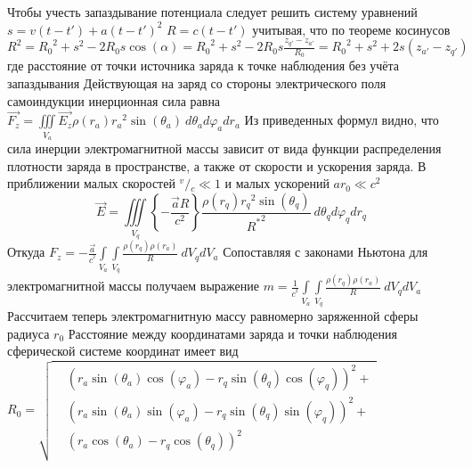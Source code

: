 ﻿\documentclass{article}
\begin{document}
Чтобы учесть запаздывание потенциала следует решить систему уравнений
$s=v\left( t-t' \right)+a{{\left( t-t' \right)}^{2}}$ 
$R=c\left( t-t' \right)$ 
учитывая, что по теореме косинусов
${{R}^{2}}={{R}_{0}}^{2}+{{s}^{2}}-2{{R}_{0}}s\cos \left( \alpha  \right)={{R}_{0}}^{2}+{{s}^{2}}-2{{R}_{0}}s\frac{{{z}_{q'}}-{{z}_{a'}}}{{{R}_{0}}}={{R}_{0}}^{2}+{{s}^{2}}+2s\left( {{z}_{a'}}-{{z}_{q'}} \right)$ 
где  расстояние от точки источника заряда к точке наблюдения без учёта запаздывания
Действующая на заряд со стороны электрического поля самоиндукции инерционная сила равна
$\overrightarrow{{{F}_{z}}}=\iiint\limits_{{{V}_{a}}}{\overrightarrow{{{E}_{z}}}\rho \left( {{r}_{a}} \right){{r}_{a}}^{2}\sin \left( {{\theta }_{a}} \right)}\ d{{\theta }_{a}}d{{\varphi }_{a}}d{{r}_{a}}$ 
Из приведенных формул видно, что сила инерции электромагнитной массы зависит от вида функции распределения плотности заряда в пространстве, а также от скорости и ускорения заряда.
В приближении малых скоростей ${}^{v}/{}_{c}\ll 1$  и малых ускорений $a{{r}_{0}}\ll {{c}^{2}}$ 
\[\overrightarrow{E}=\iiint\limits_{{{V}_{q}}}{\left\{ -\frac{\overrightarrow{a}R}{{{c}^{2}}} \right\}\frac{\rho \left( {{r}_{q}} \right){{r}_{q}}^{2}\sin \left( {{\theta }_{q}} \right)}{{{R}^{*}}^{2}}\ }d{{\theta }_{q}}d{{\varphi }_{q}}d{{r}_{q}}\]
Откуда 
${{F}_{z}}=-\frac{\overrightarrow{a}}{{{c}^{^{2}}}}\int\limits_{{{V}_{a}}}{\int\limits_{{{V}_{q}}}{\frac{\rho \left( {{r}_{q}} \right)\rho \left( {{r}_{a}} \right)}{R}}}\ d{{V}_{q}}d{{V}_{a}}$ 
Сопоставляя с законами Ньютона для электромагнитной массы получаем выражение
$m=\frac{1}{{{c}^{^{2}}}}\int\limits_{{{V}_{a}}}{\int\limits_{{{V}_{q}}}{\frac{\rho \left( {{r}_{q}} \right)\rho \left( {{r}_{a}} \right)}{R}}}\ d{{V}_{q}}d{{V}_{a}}$
Рассчитаем теперь электромагнитную массу равномерно заряженной сферы радиуса ${{r}_{0}}$ 
Расстояние между координатами заряда и точки наблюдения сферической системе координат имеет вид
${{R}_{0}}=\sqrt{\begin{align}
  & {{\left( {{r}_{a}}\sin \left( {{\theta }_{a}} \right)\cos \left( {{\varphi }_{a}} \right)-{{r}_{q}}\sin \left( {{\theta }_{q}} \right)\cos \left( {{\varphi }_{q}} \right) \right)}^{2}}+ \\ 
 & {{\left( {{r}_{a}}\sin \left( {{\theta }_{a}} \right)\sin \left( {{\varphi }_{a}} \right)-{{r}_{q}}\sin \left( {{\theta }_{q}} \right)\sin \left( {{\varphi }_{q}} \right) \right)}^{2}}+ \\ 
 & {{\left( {{r}_{a}}\cos \left( {{\theta }_{a}} \right)-{{r}_{q}}\cos \left( {{\theta }_{q}} \right) \right)}^{2}} \\ 
\end{align}}$ 
\end{document}
